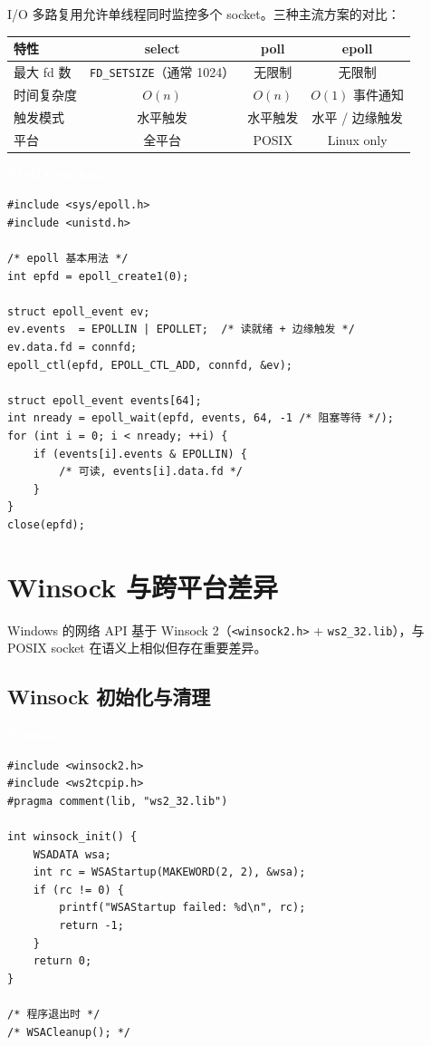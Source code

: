 \documentclass[12pt,a4paper,fontset=fandol]{ctexbook}
\newcommand{\Tp}[1]{\texttt{#1}}
\newcommand{\posixlabel}{%
  \noindent\begin{tcolorbox}[sharp corners,colback=posixheadbg,colframe=posixheadbg,
    left=6pt,right=6pt,top=2pt,bottom=2pt,boxrule=0pt]
  \textcolor{white}{\small\bfseries\sffamily POSIX Sockets}\end{tcolorbox}%
}
\newcommand{\winlabel}{%
  \noindent\begin{tcolorbox}[sharp corners,colback=winheadbg,colframe=winheadbg,
    left=6pt,right=6pt,top=2pt,bottom=2pt,boxrule=0pt]
  \textcolor{white}{\small\bfseries\sffamily Winsock}\end{tcolorbox}%
}
\begin{document}
I/O 多路复用允许单线程同时监控多个 socket。三种主流方案的对比：

\begin{compare}[title=I/O 多路复用对比]
\begin{tabular}{lccc}
\toprule
\textbf{特性} & \textbf{select} & \textbf{poll} & \textbf{epoll} \\
\midrule
最大 fd 数 & \Tp{FD\_SETSIZE}（通常 1024） & 无限制 & 无限制 \\
时间复杂度 & $O(n)$ & $O(n)$ & $O(1)$ 事件通知 \\
触发模式 & 水平触发 & 水平触发 & 水平 / 边缘触发 \\
平台 & 全平台 & POSIX & Linux only \\
\bottomrule
\end{tabular}
\end{compare}

\posixlabel
\begin{lstlisting}[style=cstyle]
#include <sys/epoll.h>
#include <unistd.h>

/* epoll 基本用法 */
int epfd = epoll_create1(0);

struct epoll_event ev;
ev.events  = EPOLLIN | EPOLLET;  /* 读就绪 + 边缘触发 */
ev.data.fd = connfd;
epoll_ctl(epfd, EPOLL_CTL_ADD, connfd, &ev);

struct epoll_event events[64];
int nready = epoll_wait(epfd, events, 64, -1 /* 阻塞等待 */);
for (int i = 0; i < nready; ++i) {
    if (events[i].events & EPOLLIN) {
        /* 可读, events[i].data.fd */
    }
}
close(epfd);
\end{lstlisting}

\chapter{Winsock 与跨平台差异}

Windows 的网络 API 基于 Winsock 2（\Tp{<winsock2.h>} + \Tp{ws2\_32.lib}），与 POSIX socket 在语义上相似但存在重要差异。

\section{Winsock 初始化与清理}

\winlabel
\begin{lstlisting}[style=cstyle]
#include <winsock2.h>
#include <ws2tcpip.h>
#pragma comment(lib, "ws2_32.lib")

int winsock_init() {
    WSADATA wsa;
    int rc = WSAStartup(MAKEWORD(2, 2), &wsa);
    if (rc != 0) {
        printf("WSAStartup failed: %d\n", rc);
        return -1;
    }
    return 0;
}

/* 程序退出时 */
/* WSACleanup(); */
\end{lstlisting}
\end{document}
